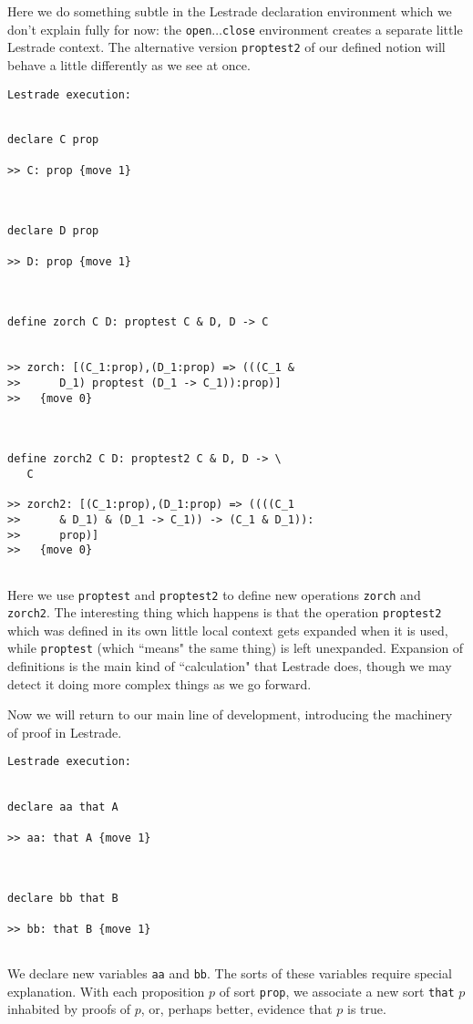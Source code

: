 \documentclass[12pt]{article}
\begin{document}
Here we do something subtle in the Lestrade declaration environment which we don't explain fully for now:  the {\tt open}$\ldots${\tt close} environment creates
a separate little Lestrade context.  The alternative version {\tt proptest2} of our defined notion will behave a little differently as we see at once.

\begin{verbatim}Lestrade execution:


declare C prop

>> C: prop {move 1}



declare D prop

>> D: prop {move 1}



define zorch C D: proptest C & D, D -> C


>> zorch: [(C_1:prop),(D_1:prop) => (((C_1 &
>>      D_1) proptest (D_1 -> C_1)):prop)]
>>   {move 0}



define zorch2 C D: proptest2 C & D, D -> \
   C

>> zorch2: [(C_1:prop),(D_1:prop) => ((((C_1
>>      & D_1) & (D_1 -> C_1)) -> (C_1 & D_1)):
>>      prop)]
>>   {move 0}


\end{verbatim}

Here we use {\tt proptest} and {\tt proptest2} to define new operations {\tt zorch} and {\tt zorch2}.  The interesting thing which happens is that the operation
{\tt proptest2} which was defined in its own little  local context gets expanded when it is used, while {\tt proptest} (which ``means" the same thing) is left unexpanded.  Expansion of definitions is the main kind of ``calculation" that Lestrade does, though we may detect it doing more complex things as we go forward.

Now we will return to our main line of development, introducing the machinery of proof in Lestrade.

\begin{verbatim}Lestrade execution:


declare aa that A

>> aa: that A {move 1}



declare bb that B

>> bb: that B {move 1}


\end{verbatim}

We declare new variables {\tt aa}  and {\tt bb}.  The sorts of these variables require special explanation.  With each proposition $p$ of sort
{\tt prop}, we associate a new sort {\tt that} $p$ inhabited by proofs of $p$, or, perhaps better, evidence that $p$ is true.
\end{document}
